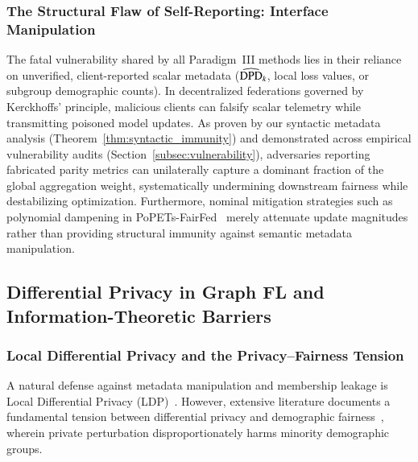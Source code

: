 \subsubsection{The Structural Flaw of Self-Reporting: Interface Manipulation}
The fatal vulnerability shared by all Paradigm~III methods lies in their reliance on unverified, client-reported scalar metadata ($\widehat{\mathrm{DPD}}_k$, local loss values, or subgroup demographic counts). In decentralized federations governed by Kerckhoffs' principle, malicious clients can falsify scalar telemetry while transmitting poisoned model updates. 
As proven by our syntactic metadata analysis (Theorem~\ref{thm:syntactic_immunity}) and demonstrated across empirical vulnerability audits (Section~\ref{subsec:vulnerability}), adversaries reporting fabricated parity metrics can unilaterally capture a dominant fraction of the global aggregation weight, systematically undermining downstream fairness while destabilizing optimization. Furthermore, nominal mitigation strategies such as polynomial dampening in PoPETs-FairFed~\citep{bendoukha2025popets} merely attenuate update magnitudes rather than providing structural immunity against semantic metadata manipulation.

\subsection{Differential Privacy in Graph FL and Information-Theoretic Barriers}
\label{subsec:rw_dp_barriers}

\subsubsection{Local Differential Privacy and the Privacy--Fairness Tension}
A natural defense against metadata manipulation and membership leakage is Local Differential Privacy (LDP)~\citep{dwork2014algorithmic, mironov2017renyi}. However, extensive literature documents a fundamental tension between differential privacy and demographic fairness~\citep{bagdasaryan2019differential, cummings2019compatibility, tran2021dperm, fioretto2022survey}, wherein private perturbation disproportionately harms minority demographic groups.

